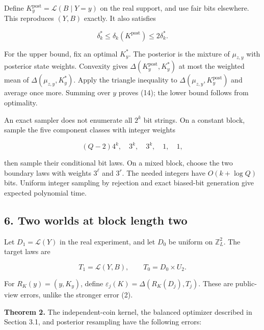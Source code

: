 \documentclass[
]{article}
\begin{document}
Define \(K^{\mathrm{post}}_y=\mathcal L(B\mid Y=y)\) on the real
support, and use fair bits elsewhere. This reproduces \((Y,B)\) exactly.
It also satisfies

\[
\delta_k^*\le\delta_k(K^{\mathrm{post}})\le2\delta_k^*.
\tag{14}
\]

For the upper bound, fix an optimal \(K^*_y\). The posterior is the
mixture of \(\mu_{z,y}\) with posterior state weights. Convexity gives
\(\Delta(K^{\mathrm{post}}_y,K^*_y)\) at most the weighted mean of
\(\Delta(\mu_{z,y},K^*_y)\). Apply the triangle inequality to
\(\Delta(\mu_{z,y},K^{\mathrm{post}}_y)\) and average once more. Summing
over \(y\) proves (14); the lower bound follows from optimality.

An exact sampler does not enumerate all \(2^k\) bit strings. On a
constant block, sample the five component classes with integer weights

\[
(Q-2)4^k,\quad3^k,\quad3^k,\quad1,\quad1,
\]

then sample their conditional bit laws. On a mixed block, choose the two
boundary laws with weights \(3^\ell\) and \(3^r\). The needed integers
have \(O(k+\log Q)\) bits. Uniform integer sampling by rejection and
exact biased-bit generation give expected polynomial time.

\subsection{6. Two worlds at block length
two}\label{two-worlds-at-block-length-two}

Let \(D_1=\mathcal L(Y)\) in the real experiment, and let \(D_0\) be
uniform on \(\mathbb Z_L^2\). The target laws are

\[
T_1=\mathcal L(Y,B),\qquad T_0=D_0\times U_2.
\]

For \(R_K(y)=(y,K_y)\), define
\(\varepsilon_j(K)=\Delta(R_K(D_j),T_j)\). These are public-view errors,
unlike the stronger error (2).

\textbf{Theorem 2.} The independent-coin kernel, the balanced optimizer
described in Section 3.1, and posterior resampling have the following
errors:
\end{document}
